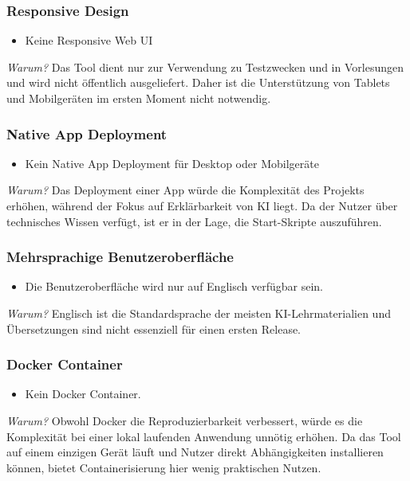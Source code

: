 \subsubsection{Responsive Design}
\begin{itemize}
    \item Keine Responsive Web UI
\end{itemize}
\textit{Warum?} Das Tool dient nur zur Verwendung zu Testzwecken und in Vorlesungen und wird nicht öffentlich ausgeliefert. Daher ist die Unterstützung von Tablets und Mobilgeräten im ersten Moment nicht notwendig.

\subsubsection{Native App Deployment}
\begin{itemize}
    \item Kein Native App Deployment für Desktop oder Mobilgeräte
\end{itemize}
\textit{Warum?} Das Deployment einer App würde die Komplexität des Projekts erhöhen, während der Fokus auf Erklärbarkeit von KI liegt.
Da der Nutzer über technisches Wissen verfügt, ist er in der Lage, die Start-Skripte auszuführen.

\subsubsection{Mehrsprachige Benutzeroberfläche}
\begin{itemize}
    \item Die Benutzeroberfläche wird nur auf Englisch verfügbar sein.
\end{itemize}
\textit{Warum?} Englisch ist die Standardsprache der meisten KI-Lehrmaterialien und Übersetzungen sind nicht essenziell für einen ersten Release.

\subsubsection{Docker Container}
\begin{itemize}
    \item Kein Docker Container.
\end{itemize}
\textit{Warum?} Obwohl Docker die Reproduzierbarkeit verbessert, würde es die Komplexität bei einer lokal laufenden Anwendung unnötig erhöhen.
Da das Tool auf einem einzigen Gerät läuft und Nutzer direkt Abhängigkeiten installieren können, bietet Containerisierung hier wenig praktischen Nutzen.

